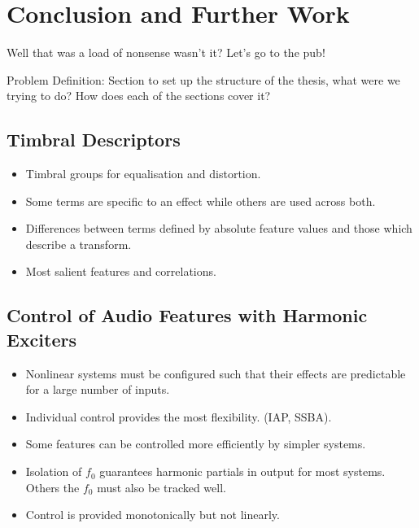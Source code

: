 \chapter{Conclusion and Further Work}
\label{chap:Conclusion}
	\note
	{
		Well that was a load of nonsense wasn't it? Let's go to the pub!
	}

	\note
	{
		Problem Definition: Section to set up the structure of the thesis, what were we trying to do? How does each
		of the sections cover it?
	}

\section{Timbral Descriptors}
\label{sec:Conclusion-Descriptors}
	\note
	{
		\begin{itemize}
			\item Timbral groups for equalisation and distortion.
			\item Some terms are specific to an effect while others are used across both.
			\item Differences between terms defined by absolute feature values and those which describe a
				transform.
			\item Most salient features and correlations.
		\end{itemize}
	}

\section{Control of Audio Features with Harmonic Exciters}
\label{sec:Conclusion-FeatureConrol}
	\note
	{
		\begin{itemize}
			\item Nonlinear systems must be configured such that their effects are predictable for a large
				number of inputs.
			\item Individual control provides the most flexibility. (IAP, SSBA).
			\item Some features can be controlled more efficiently by simpler systems.
			\item Isolation of $f_{0}$ guarantees harmonic partials in output for most systems. Others the
				$f_{0}$ must also be tracked well.
			\item Control is provided monotonically but not linearly.
		\end{itemize}
	}

